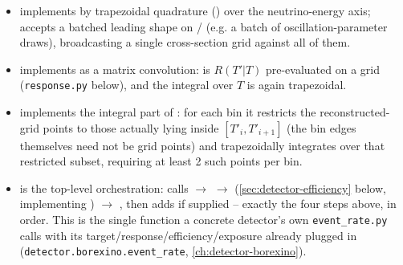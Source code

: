 \begin{implbox}
\begin{itemize}
  \item {} implements
     by trapezoidal quadrature
    () over the neutrino-energy axis; accepts a batched
    leading shape on / (e.g. a batch of
    oscillation-parameter draws), broadcasting a single cross-section grid
    against all of them.
  \item {} implements  as a
    matrix convolution:  is $R(T'|T)$ pre-evaluated on
    a  grid (\texttt{response.py} below), and the
    integral over $T$ is again trapezoidal.
  \item {} implements the integral part of
    : for each bin it restricts the
    reconstructed-grid points to those actually lying inside
    $[T'_i,T'_{i+1}]$ (the bin edges themselves need not be grid points) and
    trapezoidally integrates over that restricted subset, requiring at least
    2 such points per bin.
  \item {} is the top-level orchestration: calls
     $\to$  $\to$
    (\cref{sec:detector-efficiency} below, implementing
    ) $\to$ , then adds
     if supplied -- exactly the four steps above, in
    order. This is the single function a concrete detector's own
    \texttt{event\_rate.py} calls with its target/response/efficiency/exposure
    already plugged in (\texttt{detector.borexino.event\_rate},
    \cref{ch:detector-borexino}).
\end{itemize}
\end{implbox}

